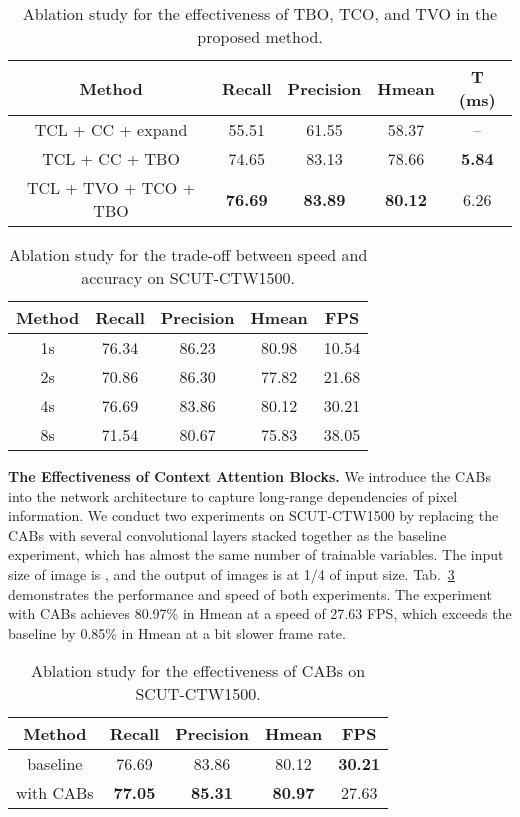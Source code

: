 \documentclass[sigconf]{acmart}
\begin{document}
\begin{table}
  \caption{Ablation study for the effectiveness of TBO, TCO, and TVO in the proposed method. }
  \label{tab:ab_main}
  \begin{tabular}{cc@{ }c@{ }c@{ }c}
    \toprule
    Method &Recall & Precision & Hmean & T (ms) \\
    \midrule
    TCL + CC + expand  &55.51	&61.55	&58.37	&--\\
    TCL + CC + TBO  &74.65	&83.13	&78.66	&\textbf{5.84} \\
    TCL + TVO + TCO + TBO  &\textbf{76.69}	&\textbf{83.89}	&\textbf{80.12}	&6.26\\
    \bottomrule
  \end{tabular}
\end{table}


\begin{table}

  \caption{Ablation study for the trade-off between speed and accuracy on SCUT-CTW1500. }
  \label{tab:ab_tradeoff}
  \begin{tabular}{ccccc}
    \toprule
     Method &Recall&Precision&Hmean & FPS\\
    \midrule
    1s &76.34 &86.23 &80.98  &10.54 \\
    2s &70.86 &86.30 &77.82  &21.68 \\
    4s &76.69 &83.86 &80.12  &30.21 \\
    8s &71.54 &80.67 &75.83  &38.05 \\
  \bottomrule
\end{tabular}
\end{table}



\textbf{The Effectiveness of Context Attention Blocks.} We introduce the CABs into the network architecture to capture long-range dependencies of pixel information. We conduct two experiments on SCUT-CTW1500 by replacing the CABs with several convolutional layers stacked together as the baseline experiment, which has almost the same number of trainable variables. The input size of image is , and the output of images is at 1/4 of input size. Tab.~\ref{tab:attention} demonstrates the performance and speed of both experiments. The experiment with CABs achieves 80.97\% in Hmean at a speed of 27.63 FPS, which exceeds the baseline by 0.85\% in Hmean at a bit slower frame rate.
\begin{table}
  \caption{ Ablation study for the effectiveness of CABs on SCUT-CTW1500.}
  \label{tab:attention}
  \begin{tabular}{ccccc}
    \toprule
      Method &Recall &Precision &Hmean &FPS\\
    \midrule
    baseline  &76.69	&83.86	&80.12 &\textbf{30.21} \\
    with CABs  &\textbf{77.05} 	&\textbf{85.31} 	&\textbf{80.97}  &27.63 \\
  \bottomrule
\end{tabular}
\end{table}
\end{document}
